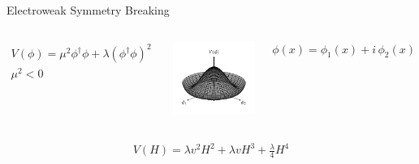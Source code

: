\documentclass[11pt, xcolor={dvipsnames}, aspectratio=169]{beamer}
\begin{document}

\begin{frame}{Electroweak Symmetry Breaking}

  \begin{columns}
    \centering


    \begin{align*}
      V(\phi) = \mu^2 \phi^\dag \phi + \lambda (\phi^\dag \phi)^2 \\
      \mu^2 < 0
    \end{align*}

    \centering

    \includegraphics[width=\textwidth]{theory/potential}

    $\phi(x) = \phi_1(x) + i \, \phi_2(x)$
  \end{columns}

  \begin{align*}
    V(H) = \lambda v^2 H^2 + \lambda v H^3 + \frac{\lambda}{4} H^4
  \end{align*}
\end{frame}

\end{document}
